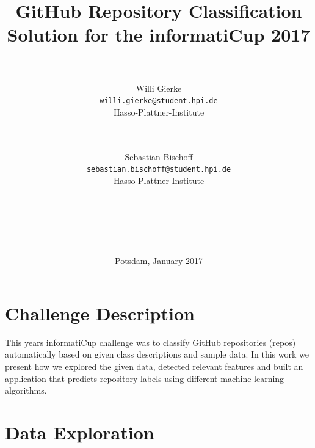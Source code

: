\documentclass[%
a4paper,
DIV12,
2.5headlines,
bigheadings,
titlepage,
openbib,
]{scrartcl}
\begin{document}
\providecommand{\tightlist}{%
  \setlength{\itemsep}{0pt}\setlength{\parskip}{0pt}}

\DeclareRobustCommand{\desiredTitle}{
  GitHub Repository Classification\\\normalsize{Solution for the informatiCup 2017}
}

\DeclareRobustCommand{\desiredAuthor}{
  \\\\Willi Gierke\\\texttt{willi.gierke@student.hpi.de}\\Hasso-Plattner-Institute \and \\\\Sebastian Bischoff\\\texttt{sebastian.bischoff@student.hpi.de}\\Hasso-Plattner-Institute\\\\\\\\\\\\
}

\begin{titlepage}
\begin{center}
   \title{\desiredTitle}
   \author{\desiredAuthor}
   \date{Potsdam, January 2017}
   \maketitle
\end{center}
\end{titlepage}

\listoftodos
\pagebreak

\tableofcontents
\pagebreak

\section{Challenge Description}\label{challenge-description}

This years informatiCup challenge was to classify GitHub repositories (repos) automatically based on given class descriptions and sample data.
In this work we present how we explored the given data, detected relevant features and built an application that predicts repository labels using different machine learning algorithms.

\section{Data Exploration}\label{data-exploration}
\end{document}
